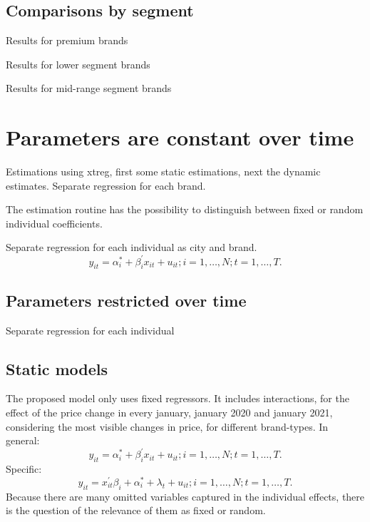 \documentclass[]{article}
\begin{document}
\subsection{Comparisons by segment}
Results for premium brands



Results for lower segment brands



Results for mid-range segment brands





\section{Parameters are constant over time }
Estimations using xtreg, first some static estimations, next the dynamic estimates.
Separate regression for each brand.

The estimation routine has the possibility to distinguish between fixed or random individual coefficients.

Separate regression for each individual as city and brand.
\begin{equation*}
	y_{it} = \alpha_{i}^{*} + \beta_{i}^{'}x_{it} + u_{it}; i = 1,\ldots,N; t=1,\ldots,T.
\end{equation*}


\subsection{Parameters restricted over time}
Separate regression for each individual

\subsection{Static models}
The proposed model only uses fixed regressors. 
It includes interactions, for the effect of the price change in every january, january 2020 and january 2021, considering the most visible changes in price, for different brand-types.
In general:
\begin{equation*}
	y_{it} = \alpha_{i}^{*} + \beta_{i}^{'}x_{it} + u_{it}; i = 1,\ldots,N; t=1,\ldots,T.
\end{equation*}
Specific:
\begin{equation*}
	y_{it} = x_{it}^{'} \beta_{i} + \alpha_{i}^{*} + \lambda_{t} + u_{it}; i = 1,\ldots,N; t=1,\ldots,T.
\end{equation*}
Because there are many omitted variables captured in the individual effects, there is the question of the relevance of them as fixed or random.
\end{document}
